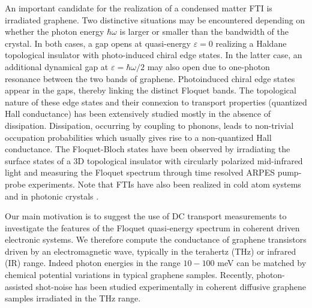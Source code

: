 \documentclass[aps,prb,showpacs,superscriptaddress,twocolumn,10pt,floatfix]{revtex4-1}
\newcommand{\ep}{\varepsilon}
\begin{document}
An important candidate for the realization of a condensed matter FTI is irradiated graphene. Two distinctive situations may be encountered depending on whether the photon energy $\hbar \omega$ is larger or smaller than the bandwidth of the crystal. In both cases, a gap opens at quasi-energy $\ep=0$ realizing a Haldane topological insulator with photo-induced chiral edge states\cite{Oka2009,Kitagawa2010,Gu2011,Lindner2011}. In the latter case, an additional dynamical gap at $\ep=\hbar\omega/2$ may also open due to one-photon resonance between the two bands of graphene. Photoinduced chiral edge states appear in the gaps, thereby linking the distinct Floquet bands\cite{Perez-Piskunow2014,Usaj2014,Kundu2014,Perez-Piskunow2015,Quelle2016}. The topological nature of these edge states and their connexion to transport properties (quantized Hall conductance) has been extensively studied \cite{Gu2011,Kitagawa2011,Foa2014,Kundu2014,Fruchart2016} mostly in the absence of dissipation. Dissipation, occurring by coupling to phonons, leads to non-trivial occupation probabilities which usually gives rise to a non-quantized Hall conductance\cite{Mitra2014,Mitra2015a,Mitra2015b,Mitra2016,Seetharam2015}. The Floquet-Bloch states have been observed by irradiating the surface states of a 3D topological insulator with circularly polarized mid-infrared light and measuring the Floquet spectrum through time resolved ARPES pump-probe experiments\cite{Wang2013}. Note that FTIs have also been realized in cold atom systems\cite{Jotzu2014} and in photonic crystals \cite{Rechtsman2013}.

Our main motivation is to suggest the use of DC transport measurements to investigate the features of the Floquet quasi-energy spectrum in coherent driven electronic systems. We therefore compute the conductance of graphene transistors driven by an electromagnetic  wave, typically in the terahertz (THz) or infrared (IR) range. Indeed photon energies in the range $10-100$ meV can be matched by chemical potential variations in typical graphene samples. Recently, photon-assisted shot-noise has been studied experimentally in coherent diffusive graphene samples irradiated in the THz range\cite{Parmentier2016}.  
\end{document}
